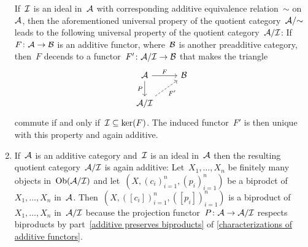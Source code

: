 \begin{remark*}
\begin{enumerate}
      If~$\mathcal{I}$ is an ideal in~$\mathcal{A}$ with corresponding additive equivalence relation~$\sim$ on~$\mathcal{A}$, then the aforementioned universal propery of the quotient category~$\mathcal{A}/{\sim}$ leads to the following universal property of the quotient category~$\mathcal{A}/\mathcal{I}$:
      If~$F \colon \mathcal{A} \to \mathcal{B}$ is an additive functor, where~$\mathcal{B}$ is another preadditive category, then~$F$ decends to a functor~$F' \colon \mathcal{A}/\mathcal{I} \to \mathcal{B}$ that makes the triangle
      \[
        \begin{tikzcd}
            \Acat
            \arrow{r}[above]{F}
            \arrow{d}[left]{P}
          & \Bcat
          \\
            \Acat/\Ideal
            \arrow[dashed]{ur}[below right]{F'}
          & {}
        \end{tikzcd}
      \]
      commute if and only if~$\mathcal{I} \subseteq \ker(F)$.
      The induced functor~$F'$ is then unique with this property and again additive.
    \item
      If~$\mathcal{A}$ is an additive category and~$\mathcal{I}$ is an ideal in~$\mathcal{A}$ then the resulting quotient category~$\mathcal{A}/\mathcal{I}$ is again additive:
      Let~$X_1, \dotsc, X_n$ be finitely many objects in~$\operatorname{Ob}(\mathcal{A}/\mathcal{I})$ and let~$(X, (c_i)_{i=1}^n, (p_i)_{i=1}^n)$ be a biprodct of~$X_1, \dotsc, X_n$ in~$\mathcal{A}$.
      Then~$(X, ([c_i])_{i=1}^n, ([p_i])_{i=1}^n)$ is a biproduct of~$X_1, \dotsc, X_n$ in~$\mathcal{A}/\mathcal{I}$ because the projection functor~$P \colon \mathcal{A} \to \mathcal{A}/\mathcal{I}$ respects biproducts by part~\ref{additive preserves biproducts} of \cref{characterizations of additive functors}.
  \end{enumerate}
\end{remark*}


